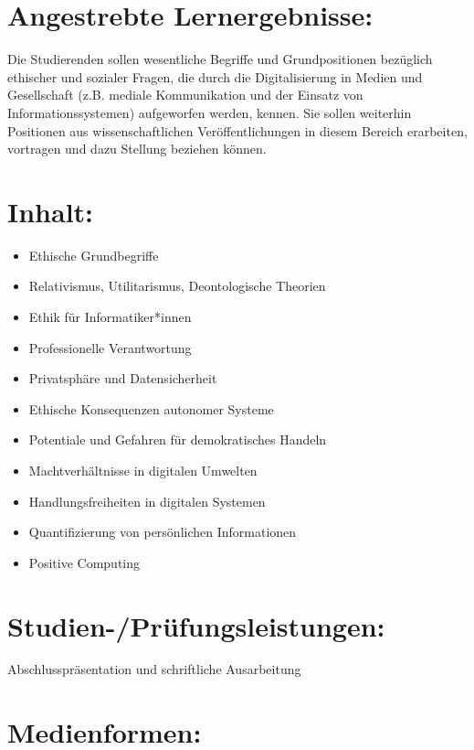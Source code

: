 \section*{Angestrebte
Lernergebnisse:}\label{angestrebte-lernergebnisse}

Die Studierenden sollen wesentliche Begriffe und Grundpositionen
bezüglich ethischer und sozialer Fragen, die durch die Digitalisierung
in Medien und Gesellschaft (z.B. mediale Kommunikation und der Einsatz
von Informationssystemen) aufgeworfen werden, kennen. Sie sollen
weiterhin Positionen aus wissenschaftlichen Veröffentlichungen in diesem
Bereich erarbeiten, vortragen und dazu Stellung beziehen können.

\section*{Inhalt:}\label{inhalt}

\begin{itemize}
\tightlist
\item
  Ethische Grundbegriffe
\item
  Relativismus, Utilitarismus, Deontologische Theorien
\item
  Ethik für Informatiker*innen
\item
  Professionelle Verantwortung
\item
  Privatsphäre und Datensicherheit
\item
  Ethische Konsequenzen autonomer Systeme
\item
  Potentiale und Gefahren für demokratisches Handeln
\item
  Machtverhältnisse in digitalen Umwelten
\item
  Handlungsfreiheiten in digitalen Systemen
\item
  Quantifizierung von persönlichen Informationen
\item
  Positive Computing
\end{itemize}

\section*{Studien-/Prüfungsleistungen:}\label{studien-pruxfcfungsleistungen}

Abschlusspräsentation und schriftliche Ausarbeitung

\section*{Medienformen:}\label{medienformen}

